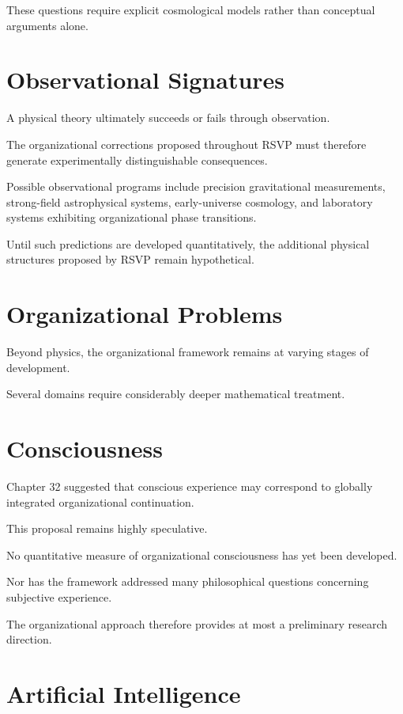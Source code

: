 \documentclass[11pt,oneside]{book}
\numberwithin{equation}{chapter}
\theoremstyle{definition}
\theoremstyle{plain}
\begin{document}
These questions require explicit cosmological models rather than
conceptual arguments alone.

\section{Observational Signatures}

A physical theory ultimately succeeds or fails through observation.

The organizational corrections proposed throughout RSVP must therefore
generate experimentally distinguishable consequences.

Possible observational programs include precision gravitational
measurements, strong-field astrophysical systems, early-universe
cosmology, and laboratory systems exhibiting organizational phase
transitions.

Until such predictions are developed quantitatively, the additional
physical structures proposed by RSVP remain hypothetical.

\section{Organizational Problems}

Beyond physics, the organizational framework remains at varying stages of
development.

Several domains require considerably deeper mathematical treatment.

\section{Consciousness}

Chapter 32 suggested that conscious experience may correspond to globally
integrated organizational continuation.

This proposal remains highly speculative.

No quantitative measure of organizational consciousness has yet been
developed.

Nor has the framework addressed many philosophical questions concerning
subjective experience.

The organizational approach therefore provides at most a preliminary
research direction.

\section{Artificial Intelligence}
\end{document}
